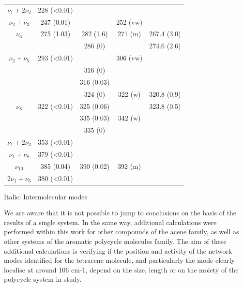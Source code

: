 \begin{table}[H]
\begin{center}
\begin{threeparttable}
\begin{tabular}{c c c c c}
 		  $\nu_{1}+ 2\nu_{2}$ & 228 (<0.01) & & & \\
 		  $\nu_{2}+\nu_{3}$& 247 (0.01) &  & 252 (vw) & \\
 		  $\nu_{6}$ & 275 (1.03) & 282 (1.6) & 271 (m) & 267.4 (3.0)\\
 		  	&  & 286 (0) &  & 274.6 (2.6)\\
 		  	$\nu_{2}+ \nu_{5}$ & 293 (<0.01) &  & 306 (vw) & \\
 		  	& & 316 (0) & & \\
 		   & & 316 (0.03) & & \\
 		    &  & 324 (0) & 322 (w) & 320.8 (0.9)\\
 		    $\nu_{8}$& 322 (<0.01) & 325 (0.06) & & 323.8 (0.5)\\
 		    &  & 335 (0.03) & 342 (w) & \\
 		    & & 335 (0) & & \\
 		    $\nu_{1}+ 2\nu_{3}$ & 353 (<0.01) & &  & \\	
 		    $\nu_{1}+ \nu_{8}$ & 379 (<0.01) & & & \\
 		    $\nu_{10}$ & 385 (0.04) & 390 (0.02) &  392 (m) & \\
 		    2$\nu_{1}+ \nu_{6}$ & 380 (<0.01) &  & & \\
 		    \bottomrule	    
 		  \end{tabular}
 		  
 		  \begin{tablenotes}
 		  	\item[] Italic: Intermolecular modes
 		  \end{tablenotes}
 		\end{threeparttable}
 	\end{center}
 \end{table}
 
 
 
 We are aware that it is not possible to jump to conclusions on the basis of the results of a single system. In the same way, additional calculations were performed within this work for other compounds of the acene family, as well as other systems of the aromatic polycycle molecules family. The aim of these additional calculations is verifying if the position and activity of the network modes identified for the tetracene molecule, and particularly the mode clearly localise at around 106 cm-1, depend on the size, length or on the moiety of the polycycle system in study.\\
 
